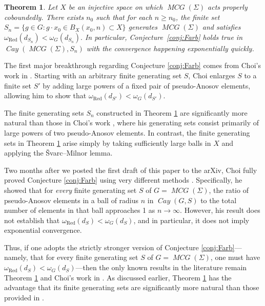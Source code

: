 \documentclass{amsart}
\newtheorem{mainthm}{Theorem}
\numberwithin{thm}{section}
\numberwithin{figure}{section}
\theoremstyle{definition}
\theoremstyle{definition}
\theoremstyle{remark}
\numberwithin{equation}{section}
\DeclareMathOperator{\Cay}{\mathit{Cay}}
\DeclareMathOperator{\MCG}{\mathit{MCG}}
\theoremstyle{plain}
\begin{document}
\begin{mainthm}\label{thm:p.A are dense} Let $X$ be an injective space on which $\MCG(\Sigma)$ acts properly coboundedly. There exists $n_0$ such that for each $n \geq n_0$, the finite set $S_n=\{g \in G: g \cdot x_0 \in B_X(x_0, n) \subset X\}$ generates $\MCG(\Sigma)$ and satisfies $\omega_{\text{Red}}(d_{S_n}) < \omega_G(d_{S_n}).$ In particular, Conjecture~\ref{conj:Farb} holds true in $\Cay(\MCG(\Sigma), S_n)$ with the convergence happening exponentially quickly.
\end{mainthm}





The first major breakthrough regarding Conjecture \ref{conj:Farb} comes from Choi's work in \cite{Choi2021PseudoAnosovsAE}. Starting with an arbitrary finite generating set \(S\), Choi enlarges \(S\) to a finite set \(S'\) by adding large powers of a fixed pair of pseudo-Anosov elements, allowing him to show that $\omega_{\text{Red}}({d_{S'}}) < \omega_G({d_{S'}})$. 

The finite generating sets \( S_n \) constructed in Theorem \ref{thm:p.A are dense} are significantly more natural than those in Choi's work \cite{Choi2021PseudoAnosovsAE}, where his generating sets consist primarily of large powers of two pseudo-Anosov elements. In contrast, the finite generating sets in Theorem \ref{thm:p.A are dense} arise simply by taking sufficiently large balls in \( X \) and applying the Švarc–Milnor lemma. 

Two months after we posted the first draft of this paper to the arXiv, Choi fully proved Conjecture \ref{conj:Farb} using very different methods \cite{Full}. Specifically, he showed that for \emph{every} finite generating set \( S \) of \( G=\MCG(\Sigma) \), the ratio of pseudo-Anosov elements in a ball of radius \( n \) in \( \Cay(G,S) \) to the total number of elements in that ball approaches 1 as \( n \to \infty \). However, his result does not establish that $\omega_{\text{Red}}({d_S}) < \omega_G({d_S})$, and in particular, it does not imply exponential convergence. 

Thus, if one adopts the strictly stronger version of Conjecture \ref{conj:Farb}—namely, that for every finite generating set \( S \) of \( G=\MCG(\Sigma) \), one must have \( \omega_{\text{Red}}({d_S}) < \omega_G({d_S}) \)—then the only known results in the literature remain Theorem \ref{thm:p.A are dense} and Choi's work in \cite{Choi2021PseudoAnosovsAE}. As discussed earlier, Theorem \ref{thm:p.A are dense} has the advantage that its finite generating sets are significantly more natural than those provided in \cite{Choi2021PseudoAnosovsAE}.
\end{document}
